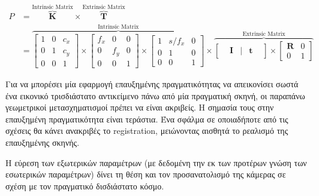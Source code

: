 \begin{equation} 
\begin{split}
P
&=
\overbrace{
\mathbf{K}}^\text{Intrinsic Matrix} \times 
\overbrace{
\mathbf{T}
}^\text{Extrinsic Matrix} 
\\&=
\overbrace{
\begin{bmatrix}
1 & 0 & c_{x} \\ 
0 & 1 & c_{y} \\ 
0 & 0 & 1  
\end{bmatrix}
\times 
\begin{bmatrix}
f_{x} & 0 & 0 \\ 
0 & f_{y} & 0 \\ 
0 & 0 & 1  
\end{bmatrix}
\times
\begin{bmatrix}
1 & s/f_{x} & 0 \\ 
0 & 1 & 0 \\ 
0 & 0 & 1  
\end{bmatrix}
}^\text{Intrinsic Matrix}
\times
\overbrace{
\begin{bmatrix}
&\mathbf{I}& |& \mathbf{t}&
\end{bmatrix}
\times
\begin{bmatrix}
\mathbf{R} &    0 \\
0 &    1 
\end{bmatrix}}^\text{Extrinsic Matrix}
\end{split}
\end{equation}


Για να μπορέσει μία εφαρμογή επαυξημένης πραγματικότητας να απεικονίσει σωστά ένα εικονικό τρισδιάστατο αντικείμενο πάνω από μία πραγματική σκηνή, οι παραπάνω γεωμετρικοί μετασχηματισμοί πρέπει να είναι ακριβείς. H σημασία τους στην επαυξημένη πραγματικότητα είναι τεράστια. Ένα σφάλμα σε οποιαδήποτε από τις σχέσεις θα κάνει ανακριβές το registration, μειώνοντας αισθητά το ρεαλισμό της επαυξημένης σκηνής. 


Η εύρεση των εξωτερικών παραμέτρων (με δεδομένη την εκ των προτέρων γνώση των εσωτερικών παραμέτρων) δίνει τη θέση και τον προσανατολισμό της κάμερας σε σχέση με τον πραγματικό δισδιάστατο κόσμο.



